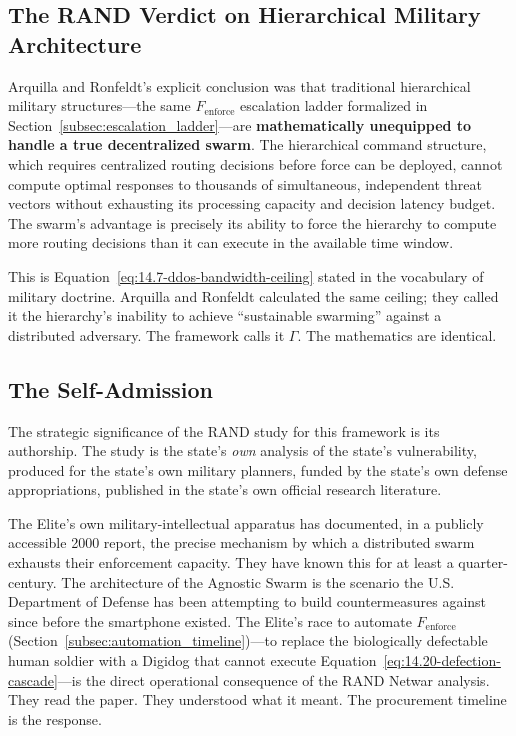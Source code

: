 \subsection{The RAND Verdict on Hierarchical Military Architecture}

Arquilla and Ronfeldt's explicit conclusion was that traditional hierarchical military structures---the same $F_{\text{enforce}}$ escalation ladder formalized in Section~\ref{subsec:escalation_ladder}---are \textbf{mathematically unequipped to handle a true decentralized swarm}. The hierarchical command structure, which requires centralized routing decisions before force can be deployed, cannot compute optimal responses to thousands of simultaneous, independent threat vectors without exhausting its processing capacity and decision latency budget. The swarm's advantage is precisely its ability to force the hierarchy to compute more routing decisions than it can execute in the available time window.

This is Equation~\eqref{eq:14.7-ddos-bandwidth-ceiling} stated in the vocabulary of military doctrine. Arquilla and Ronfeldt calculated the same ceiling; they called it the hierarchy's inability to achieve ``sustainable swarming'' against a distributed adversary. The framework calls it $\Gamma$. The mathematics are identical.

\subsection{The Self-Admission}

The strategic significance of the RAND study for this framework is its authorship. The study is the state's \textit{own} analysis of the state's vulnerability, produced for the state's own military planners, funded by the state's own defense appropriations, published in the state's own official research literature.

The Elite's own military-intellectual apparatus has documented, in a publicly accessible 2000 report, the precise mechanism by which a distributed swarm exhausts their enforcement capacity. They have known this for at least a quarter-century. The architecture of the Agnostic Swarm is the scenario the U.S. Department of Defense has been attempting to build countermeasures against since before the smartphone existed. The Elite's race to automate $F_{\text{enforce}}$ (Section~\ref{subsec:automation_timeline})---to replace the biologically defectable human soldier with a Digidog that cannot execute Equation~\eqref{eq:14.20-defection-cascade}---is the direct operational consequence of the RAND Netwar analysis. They read the paper. They understood what it meant. The procurement timeline is the response.

